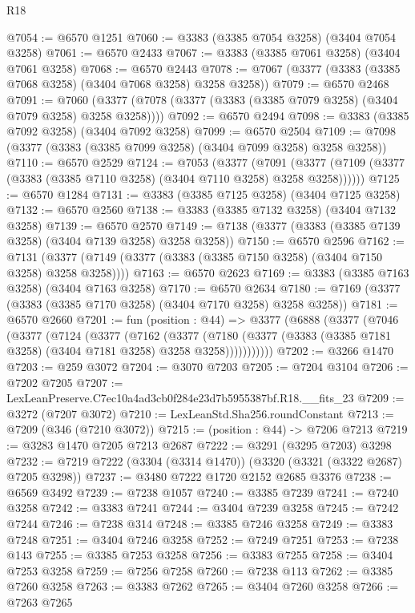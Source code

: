 \begin{lexlean}{R18}
\begin{coremodule}
@7054 := @6570 @1251
@7060 := @3383 (@3385 @7054 @3258) (@3404 @7054 @3258)
@7061 := @6570 @2433
@7067 := @3383 (@3385 @7061 @3258) (@3404 @7061 @3258)
@7068 := @6570 @2443
@7078 := @7067 (@3377 (@3383 (@3385 @7068 @3258) (@3404 @7068 @3258) @3258 @3258))
@7079 := @6570 @2468
@7091 := @7060 (@3377 (@7078 (@3377 (@3383 (@3385 @7079 @3258) (@3404 @7079 @3258) @3258 @3258))))
@7092 := @6570 @2494
@7098 := @3383 (@3385 @7092 @3258) (@3404 @7092 @3258)
@7099 := @6570 @2504
@7109 := @7098 (@3377 (@3383 (@3385 @7099 @3258) (@3404 @7099 @3258) @3258 @3258))
@7110 := @6570 @2529
@7124 := @7053
    (@3377
      (@7091 (@3377 (@7109 (@3377 (@3383 (@3385 @7110 @3258) (@3404 @7110 @3258) @3258 @3258))))))
@7125 := @6570 @1284
@7131 := @3383 (@3385 @7125 @3258) (@3404 @7125 @3258)
@7132 := @6570 @2560
@7138 := @3383 (@3385 @7132 @3258) (@3404 @7132 @3258)
@7139 := @6570 @2570
@7149 := @7138 (@3377 (@3383 (@3385 @7139 @3258) (@3404 @7139 @3258) @3258 @3258))
@7150 := @6570 @2596
@7162 := @7131 (@3377 (@7149 (@3377 (@3383 (@3385 @7150 @3258) (@3404 @7150 @3258) @3258 @3258))))
@7163 := @6570 @2623
@7169 := @3383 (@3385 @7163 @3258) (@3404 @7163 @3258)
@7170 := @6570 @2634
@7180 := @7169 (@3377 (@3383 (@3385 @7170 @3258) (@3404 @7170 @3258) @3258 @3258))
@7181 := @6570 @2660
@7201 := fun (position : @44) =>
  @3377
    (@6888
      (@3377
        (@7046
          (@3377
            (@7124
              (@3377
                (@7162
                  (@3377
                    (@7180
                      (@3377 (@3383 (@3385 @7181 @3258) (@3404 @7181 @3258) @3258 @3258)))))))))))
@7202 := @3266 @1470
@7203 := @259 @3072
@7204 := @3070 @7203
@7205 := @7204 @3104
@7206 := @7202 @7205
@7207 := LexLeanPreserve.C7ec10a4ad3cb0f284e23d7b5955387bf.R18.__fits_23
@7209 := @3272 (@7207 @3072)
@7210 := LexLeanStd.Sha256.roundConstant
@7213 := @7209 (@346 (@7210 @3072))
@7215 := (position : @44) -> @7206 @7213
@7219 := @3283 @1470 @7205 @7213 @2687
@7222 := @3291 (@3295 @7203) @3298
@7232 := @7219 @7222 (@3304 (@3314 @1470)) (@3320 (@3321 (@3322 @2687) @7205 @3298))
@7237 := @3480 @7222 @1720 @2152 @2685 @3376
@7238 := @6569 @3492
@7239 := @7238 @1057
@7240 := @3385 @7239
@7241 := @7240 @3258
@7242 := @3383 @7241
@7244 := @3404 @7239 @3258
@7245 := @7242 @7244
@7246 := @7238 @314
@7248 := @3385 @7246 @3258
@7249 := @3383 @7248
@7251 := @3404 @7246 @3258
@7252 := @7249 @7251
@7253 := @7238 @143
@7255 := @3385 @7253 @3258
@7256 := @3383 @7255
@7258 := @3404 @7253 @3258
@7259 := @7256 @7258
@7260 := @7238 @113
@7262 := @3385 @7260 @3258
@7263 := @3383 @7262
@7265 := @3404 @7260 @3258
@7266 := @7263 @7265

\end{coremodule}
\end{lexlean}
